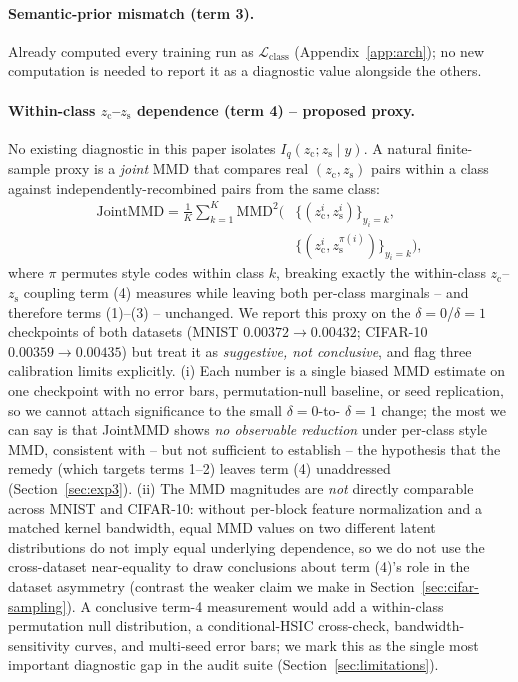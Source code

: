 \documentclass[10pt,letterpaper]{article}
\newcommand{\zc}{z_{\mathrm{c}}}
\newcommand{\zs}{z_{\mathrm{s}}}
\newcommand{\MMD}{\mathrm{MMD}}
\begin{document}
\paragraph{Semantic-prior mismatch (term 3).} Already computed every
training run as $\mathcal L_{\mathrm{class}}$ (Appendix~\ref{app:arch}); no
new computation is needed to report it as a diagnostic value alongside the
others.

\paragraph{Within-class $\zc$--$\zs$ dependence (term 4) -- proposed
proxy.} No existing diagnostic in this paper isolates
$I_q(\zc;\zs\mid y)$. A natural finite-sample proxy is a \emph{joint} MMD
that compares real $(\zc,\zs)$ pairs within a class against
independently-recombined pairs from the same class:
\begin{align*}
\mathrm{JointMMD} = \frac1K\sum_{k=1}^K \MMD^2\bigl(
  &\{(\zc^i,\zs^i)\}_{y_i=k},\, \\
  &\{(\zc^i,\zs^{\pi(i)})\}_{y_i=k}\bigr),
\end{align*}
where $\pi$ permutes style codes within class $k$, breaking exactly the
within-class $\zc$--$\zs$ coupling term (4) measures while leaving both
per-class marginals -- and therefore terms (1)--(3) -- unchanged. We report
this proxy on the $\delta{=}0$/$\delta{=}1$ checkpoints of both datasets
(MNIST $0.00372\to0.00432$; CIFAR-10 $0.00359\to0.00435$) but treat it as
\emph{suggestive, not conclusive}, and flag three calibration limits
explicitly. (i) Each number is a single biased MMD estimate on one
checkpoint with no error bars, permutation-null baseline, or seed
replication, so we cannot attach significance to the small $\delta{=}0$-to-
$\delta{=}1$ change; the most we can say is that JointMMD shows \emph{no
observable reduction} under per-class style MMD, consistent with -- but not
sufficient to establish -- the hypothesis that the remedy (which targets
terms 1--2) leaves term (4) unaddressed (Section~\ref{sec:exp3}). (ii) The
MMD magnitudes are \emph{not} directly comparable across MNIST and CIFAR-10:
without per-block feature normalization and a matched kernel bandwidth,
equal MMD values on two different latent distributions do not imply equal
underlying dependence, so we do not use the cross-dataset near-equality to
draw conclusions about term (4)'s role in the dataset asymmetry
(contrast the weaker claim we make in Section~\ref{sec:cifar-sampling}). A
conclusive term-4 measurement would add a within-class permutation null
distribution, a conditional-HSIC cross-check, bandwidth-sensitivity curves,
and multi-seed error bars; we mark this as the single most important
diagnostic gap in the audit suite (Section~\ref{sec:limitations}).
\end{document}
